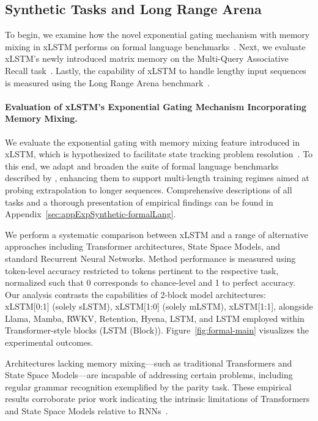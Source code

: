 \subsection{Synthetic Tasks and Long Range Arena}
\label{sec:ExpSyntethic}
To begin, we examine how the novel exponential gating mechanism with memory mixing in xLSTM performs on formal language benchmarks~\citep{Deletang:23}. Next, we evaluate xLSTM's newly introduced matrix memory on the Multi-Query Associative Recall task~\citep{Arora:23arxiv}. Lastly, the capability of xLSTM to handle lengthy input sequences is measured using the Long Range Arena benchmark~\citep{Tay:21}.

\paragraph{Evaluation of xLSTM’s Exponential Gating Mechanism Incorporating Memory Mixing.} We evaluate the exponential gating with memory mixing feature introduced in xLSTM, which is hypothesized to facilitate state tracking problem resolution~\citep{Merrill:24, Merrill:23}. To this end, we adapt and broaden the suite of formal language benchmarks described by \citet{Deletang:23}, enhancing them to support multi-length training regimes aimed at probing extrapolation to longer sequences. Comprehensive descriptions of all tasks and a thorough presentation of empirical findings can be found in Appendix~\ref{sec:appExpSynthetic-formalLang}. 

We perform a systematic comparison between xLSTM and a range of alternative approaches including Transformer architectures, State Space Models, and standard Recurrent Neural Networks. Method performance is measured using token-level accuracy restricted to tokens pertinent to the respective task, normalized such that 0 corresponds to chance-level and 1 to perfect accuracy. Our analysis contrasts the capabilities of 2-block model architectures: xLSTM[0:1] (solely sLSTM), xLSTM[1:0] (solely mLSTM), xLSTM[1:1], alongside Llama, Mamba, RWKV, Retention, Hyena, LSTM, and LSTM employed within Transformer-style blocks (LSTM (Block)). Figure~\ref{fig:formal-main} visualizes the experimental outcomes.

Architectures lacking memory mixing—such as traditional Transformers and State Space Models—are incapable of addressing certain problems, including regular grammar recognition exemplified by the parity task. These empirical results corroborate prior work indicating the intrinsic limitations of Transformers and State Space Models relative to RNNs~\citep{Merrill:24, Merrill:23, Deletang:23}.

